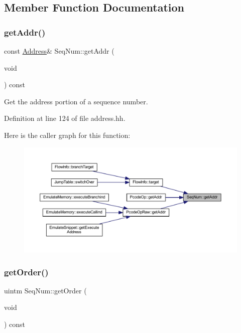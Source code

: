\subsection{Member Function Documentation}
\mbox{\label{class_seq_num_a3c1ae4e878e3c4478303caf115afb85f}} 
\subsubsection{\texorpdfstring{getAddr()}{getAddr()}}
{\footnotesize\ttfamily const \mbox{\hyperlink{class_address}{Address}}\& Seq\+Num\+::get\+Addr (\begin{DoxyParamCaption}\item[{void}]{ }\end{DoxyParamCaption}) const\hspace{0.3cm}{\ttfamily [inline]}}



Get the address portion of a sequence number. 



Definition at line 124 of file address.\+hh.

Here is the caller graph for this function\+:
\nopagebreak
\begin{figure}[H]
\begin{center}
\leavevmode
\includegraphics[width=350pt]{class_seq_num_a3c1ae4e878e3c4478303caf115afb85f_icgraph}
\end{center}
\end{figure}
\mbox{\label{class_seq_num_af42e406cdae712585cbfe1e95b2fceb8}} 
\subsubsection{\texorpdfstring{getOrder()}{getOrder()}}
{\footnotesize\ttfamily uintm Seq\+Num\+::get\+Order (\begin{DoxyParamCaption}\item[{void}]{ }\end{DoxyParamCaption}) const\hspace{0.3cm}{\ttfamily [inline]}}



